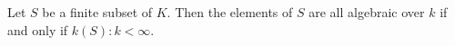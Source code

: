 Let $S$ be a finite subset of $K$. Then the elements of $S$ are all algebraic over $k$ if and only if $k(S):k < \infty$.
